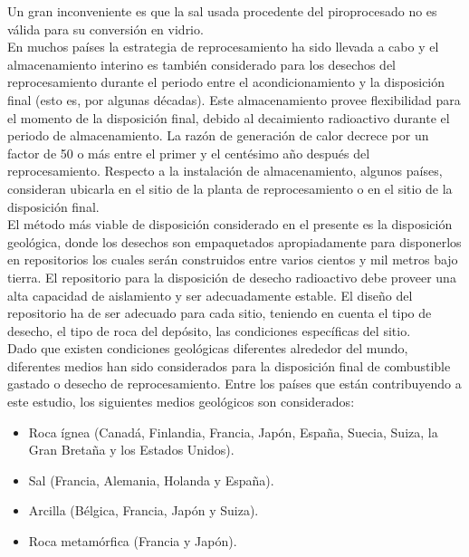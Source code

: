 \documentclass[]{article}
\begin{document}
Un gran inconveniente es que la sal usada procedente del piroprocesado no es válida para su conversión en vidrio.\\

En muchos países la estrategia de reprocesamiento ha sido llevada a cabo y el almacenamiento interino es también considerado para los desechos del reprocesamiento durante el periodo entre el acondicionamiento y la disposición final (esto es, por algunas décadas). Este almacenamiento provee flexibilidad para  el momento de la disposición final, debido al decaimiento radioactivo durante el periodo de almacenamiento. La razón de generación de calor decrece por un factor de 50 o más entre el primer y el centésimo año después del reprocesamiento. Respecto a la instalación de almacenamiento, algunos países, consideran ubicarla en el sitio de la planta de reprocesamiento o en el sitio de la disposición final.\\

El método más viable de disposición considerado en el presente es la disposición geológica, donde los desechos son empaquetados apropiadamente para disponerlos en repositorios los cuales serán construidos entre varios cientos y mil metros bajo tierra. El repositorio para la disposición de desecho radioactivo debe proveer una alta capacidad de aislamiento y ser adecuadamente estable. El diseño del repositorio ha de ser adecuado para cada sitio, teniendo en cuenta el tipo de desecho, el tipo de roca del depósito, las condiciones específicas del sitio.\\

 Dado que existen condiciones geológicas diferentes alrededor del mundo,  diferentes medios han sido considerados  para la disposición final de combustible gastado o desecho de reprocesamiento. Entre los países que están contribuyendo a este estudio, los siguientes medios geológicos son considerados:\\
 
 \begin{itemize}
 	 
 	\item Roca ígnea (Canadá, Finlandia, Francia, Japón, España, Suecia, Suiza, la Gran Bretaña y los Estados Unidos).
 	
 	\item Sal (Francia, Alemania, Holanda y España).
 	
 	\item Arcilla (Bélgica, Francia, Japón y Suiza).
 	
 	\item Roca metamórfica (Francia y Japón).
 	
 \end{itemize}
\end{document}
